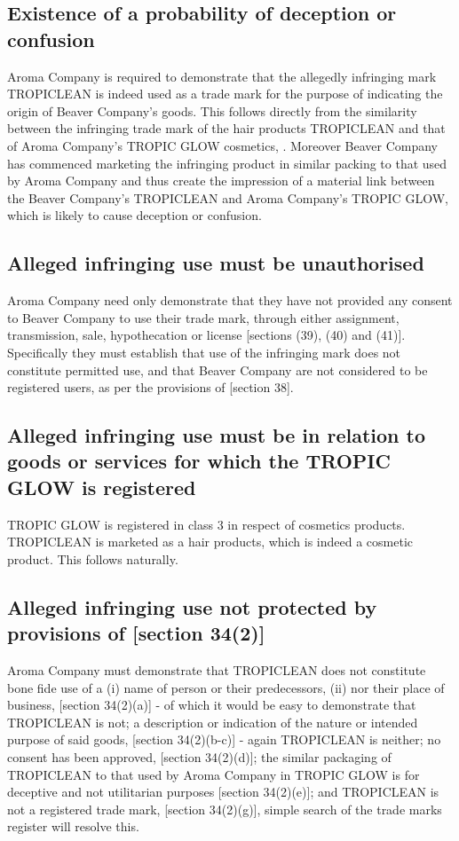 \documentclass[11pt]{article}
\begin{document}
\subsection{Existence of a probability of deception or confusion}
\label{sec:org12d680d}
Aroma Company is required to demonstrate that the allegedly infringing mark
TROPICLEAN is indeed used as a trade mark for the purpose of indicating the
origin of Beaver Company's goods. This follows directly from the similarity
between the infringing trade mark of the hair products TROPICLEAN and that of
Aroma Company's TROPIC GLOW cosmetics, \cite{wipo57_ncl}. Moreover Beaver Company has commenced
marketing the infringing product in similar packing to that used by Aroma
Company and thus create the impression of a material link between the Beaver
Company's TROPICLEAN and Aroma Company's TROPIC GLOW, which is likely to cause
deception or confusion.

\subsection{Alleged infringing use must be unauthorised}
\label{sec:org4c8a3bf}
Aroma Company need only demonstrate that they have not provided any consent to
Beaver Company to use their trade mark, through either assignment, transmission, sale,
hypothecation or license [sections (39), (40) and (41)]\cite{rsa93_tm_act}. Specifically they must
establish that use of the infringing mark does not constitute permitted use, and
that Beaver Company are not considered to be registered users, as per the
provisions of [section 38]\cite{rsa93_tm_act}.

\subsection{Alleged infringing use must be in relation to goods or services for which the TROPIC GLOW is registered}
\label{sec:org0468540}
TROPIC GLOW is registered in class 3 in respect of cosmetics products.
TROPICLEAN is marketed as a hair products, which is indeed a cosmetic product.
This follows naturally.

\subsection{Alleged infringing use not protected by provisions of [section 34(2)]}
\label{sec:org7372c47}
Aroma Company must demonstrate that TROPICLEAN does not constitute bone fide use
of a (i) name of person or their predecessors, (ii) nor their place of business,
[section 34(2)(a)]\cite{rsa93_tm_act} - of which it would be easy to demonstrate
that TROPICLEAN is not; a description or indication of the nature or intended
purpose of said goods, [section 34(2)(b-c)]\cite{rsa93_tm_act} - again TROPICLEAN
is neither; no consent has been approved, [section 34(2)(d)]\cite{rsa93_tm_act};
the similar packaging of TROPICLEAN to that used by Aroma Company in TROPIC GLOW
is for deceptive and not utilitarian purposes [section
34(2)(e)]\cite{rsa93_tm_act}; and TROPICLEAN is not a registered trade mark,
[section 34(2)(g)], simple search of the trade marks register will resolve this.
\end{document}
